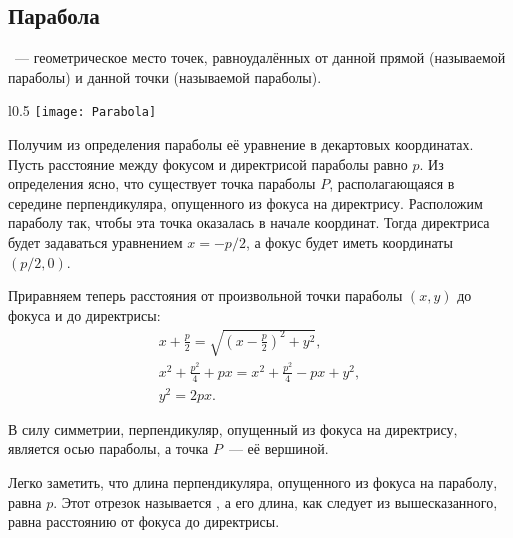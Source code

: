 \subsection{Парабола}
~--- геометрическое место точек, равноудалённых от данной прямой (называемой  параболы) и данной точки (называемой  параболы).

\begin{wrapfigure}[11]{l}{0.5\tw}
	\centering
	\vspace{-.7pc}
	\texttt{[image: Parabola]}
\end{wrapfigure}
Получим из определения параболы её уравнение в декартовых координатах. Пусть расстояние между фокусом и директрисой параболы равно $p$. Из определения ясно, что существует точка параболы $P$, располагающаяся в середине перпендикуляра, опущенного из фокуса на директрису. Расположим параболу так, чтобы эта точка оказалась в начале координат. Тогда директриса будет задаваться уравнением $x = -p/2$, а фокус будет иметь координаты $(p/2, 0)$.

Приравняем теперь расстояния от произвольной точки параболы $(x, y)$ до фокуса и до директрисы:
\begin{gather*}
	x + \frac{p}{2} = \sqrt{\left(x - \frac{p}{2} \right)^2 + y^2},\\
	x^2 + \frac{p^2}{4} + px = x^2 + \frac{p^2}{4} - px + y^2,\\
	y^2 = 2px. \tag{\theequation}
\end{gather*}

В силу симметрии, перпендикуляр, опущенный из фокуса на директрису, является осью параболы, а точка $P$~--- её вершиной.

Легко заметить, что длина перпендикуляра, опущенного из фокуса на параболу, равна $p$. Этот отрезок называется , а его длина, как следует из вышесказанного, равна расстоянию от фокуса до директрисы.


